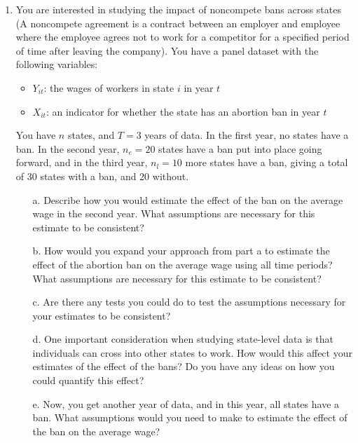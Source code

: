 \documentclass[11pt, a4paper]{article}
\begin{document}
\begin{enumerate}
    
  \item You are interested in studying the impact of noncompete bans across states (A noncompete agreement is a contract between an employer and employee where the employee agrees not to work for a competitor for a specified period of time after leaving the company). You have a panel dataset with the following variables:
    \begin{itemize}
    \item $Y_{it}$: the wages of workers in state $i$ in year $t$
    \item $X_{it}$: an indicator for whether the state has an abortion ban in year $t$
    \end{itemize}
    You have $n$ states, and $T=3$ years of data. In the first year, no states have a ban. In the second year, $n_{e} = 20$ states have a ban put into place going forward, and in the third year, $n_{l} = 10$ more states have a ban, giving a total of 30 states with a ban, and 20 without.
    \begin{enumerate}
        \item[a.] Describe how you would estimate the effect of the ban on the average wage in the second year. What assumptions are necessary for this estimate to be consistent?
        \item[b.] How would you expand your approach from part a to estimate the effect of the abortion ban on the average wage using all time periods? What assumptions are necessary for this estimate to be consistent?
        \item[c.] Are there any tests you could do to test the assumptions necessary for your estimates to be consistent?
        \item[d.] One important consideration when studying state-level data is that individuals can cross into other states to work. How would this affect your estimates of the effect of the bans? Do you have any ideas on how you could quantify this effect?
        \item[e.] Now, you get another year of data, and in this year, all states have a ban. What assumptions would you need to make to estimate the effect of the ban on the average wage?
    \end{enumerate}    
\end{enumerate}
  
\end{document}
